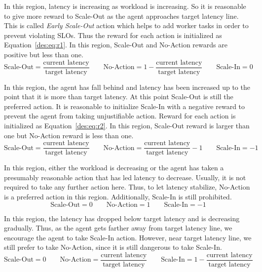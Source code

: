 \begin{description}[leftmargin=0pt]
    \item[Region 1] In this region, latency is increasing as workload is increasing. So it is reasonable to give more reward to Scale-Out as the agent approaches target latency line. This is called \emph{Early Scale-Out} action which helps to add worker tasks in order to prevent violating SLOs. Thus the reward for each action is initialized as Equation~\ref{des:eq:r1}. In this region, Scale-Out and No-Action rewards are positive but less than one.
    \begin{equation}
    \text{Scale-Out}=\frac{\text{current latency}}{\text{target latency}} \qquad \text{No-Action}=1-\frac{\text{current latency}}{\text{target latency}} \qquad \text{Scale-In}=0
    \label{des:eq:r1}
    \end{equation}
    \item[Region 2] In this region, the agent has fall behind and latency has been increased up to the point that it is more than target latency. At this point Scale-Out is still the preferred action. It is reasonable to initialize Scale-In with a negative reward to prevent the agent from taking unjustifiable action.
    Reward for each action is initialized as Equation~\ref{des:eq:r2}. In this region, Scale-Out reward is larger than one but No-Action reward is less than one.
    \begin{equation}
    \text{Scale-Out}=\frac{\text{current latency}}{\text{target latency}} \qquad \text{No-Action}=\frac{\text{current latency}}{\text{target latency}}-1 \qquad \text{Scale-In}=-1
    \label{des:eq:r2}
    \end{equation}
    \item[Region 3] In this region, either the workload is decreasing or the agent has taken a presumably reasonable action that has led latency to decrease. Usually, it is not required to take any further action here. Thus, to let latency stabilize, No-Action is a preferred action in this region. Additionally, Scale-In is still prohibited.
    \begin{equation}
    \text{Scale-Out}=0 \qquad \text{No-Action}=1 \qquad \text{Scale-In}=-1
    \label{des:eq:r3}
    \end{equation}
    \item[Region 4] In this region, the latency has dropped below target latency and is decreasing gradually. Thus, as the agent gets farther away from target latency line, we encourage the agent to take Scale-In action. However, near target latency line, we still prefer to take No-Action, since it is still dangerous to take Scale-In.
    \begin{equation}
    \text{Scale-Out}=0 \qquad \text{No-Action}=\frac{\text{current latency}}{\text{target latency}} \qquad \text{Scale-In}=1-\frac{\text{current latency}}{\text{target latency}}
    \label{des:eq:r4}
    \end{equation}
\end{description}
